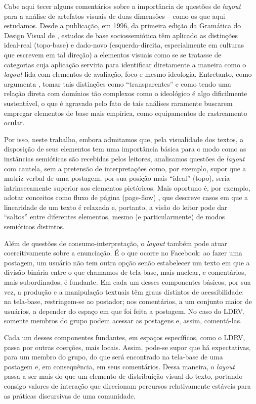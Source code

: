 \documentclass{textolivre}
\begin{document}
Cabe aqui tecer alguns comentários sobre a importância de questões de \textit{layout} para a análise de artefatos visuais de duas dimensões – como os que aqui estudamos. Desde a publicação, em 1996, da primeira edição da Gramática do Design Visual de \textcite{kress2006}, estudos de base sociossemiótica têm aplicado as distinções ideal-real (topo-base) e dado-novo (esquerda-direita, especialmente em culturas que escrevem em tal direção) a elementos visuais como se se tratasse de categorias cuja aplicação serviria para identificar diretamente a maneira como o \textit{layout} lida com elementos de avaliação, foco e mesmo ideologia. Entretanto, como argumenta \textcite[p. 43-50]{bateman2008}, tomar tais distinções como “transparentes” e como tendo uma relação direta com domínios tão complexos como o ideológico é algo dificilmente sustentável, o que é agravado pelo fato de tais análises raramente buscarem empregar elementos de base mais empírica, como equipamentos de rastreamento ocular.

Por isso, neste trabalho, embora admitamos que, pela visualidade dos textos, a disposição de seus elementos tem uma importância básica para o modo como as instâncias semióticas são recebidas pelos leitores, analisamos questões de \textit{layout} com cautela, sem a pretensão de interpretações como, por exemplo, supor que a matriz verbal de uma postagem, por sua posição mais “ideal” (topo), seria intrinsecamente superior aos elementos pictóricos. Mais oportuno é, por exemplo, adotar conceitos como fluxo de página (page-flow) \cite{bateman2008}, que descreve casos em que a linearidade de um texto é relaxada e, portanto, a visão do leitor pode dar “saltos” entre diferentes elementos, mesmo (e particularmente) de modos semióticos distintos.

Além de questões de consumo-interpretação, o \textit{layout} também pode atuar coercitivamente sobre a enunciação. É o que ocorre no Facebook: ao fazer uma postagem, um usuário não tem outra opção senão estabelecer um texto em que a divisão binária entre o que chamamos de tela-base, mais nuclear, e comentários, mais subordinados, é fundante. Em cada um desses componentes básicos, por sua vez, a produção e a manipulação textuais têm graus distintos de acessibilidade: na tela-base, restringem-se ao postador; nos comentários, a um conjunto maior de usuários, a depender do espaço em que foi feita a postagem. No caso do LDRV, somente membros do grupo podem acessar as postagens e, assim, comentá-las.

Cada um desses componentes fundantes, em espaços específicos, como o LDRV, passa por outras coerções, mais locais. Assim, pode-se supor que há expectativas, para um membro do grupo, do que será encontrado na tela-base de uma postagem e, em consequência, em seus comentários. Dessa maneira, o \textit{layout} passa a ser mais do que um elemento de distribuição visual do texto, portando consigo valores de interação que direcionam percursos relativamente estáveis para as práticas discursivas de uma comunidade.
\end{document}
